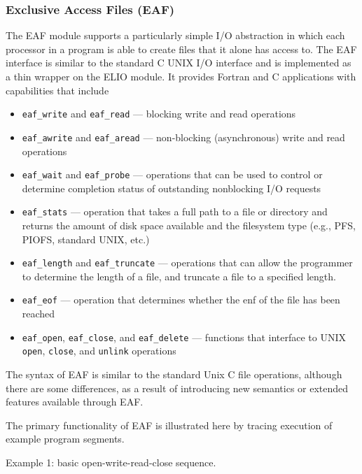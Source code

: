 \subsubsection{Exclusive Access Files (EAF)}

The EAF module supports a particularly simple I/O abstraction in which each processor
in a program is able to create files that it alone has access to.  The EAF interface
is similar to the standard C UNIX I/O interface and is implemented as a thin
wrapper on the ELIO module.  It provides Fortran and C applications with capabilities
that include

\begin{itemize}

\item {\tt eaf\_write} and {\tt eaf\_read} --- blocking write and read operations
\item {\tt eaf\_awrite} and {\tt eaf\_aread} --- non-blocking (asynchronous) 
write and read operations
\item {\tt eaf\_wait} and {\tt eaf\_probe} --- operations that can be used to control
or determine completion status of outstanding nonblocking I/O requests
\item {\tt eaf\_stats} --- operation that takes a full path to a file or directory and
returns the amount of disk space available and the filesystem type (e.g., PFS, PIOFS,
standard UNIX, etc.)
\item {\tt eaf\_length} and {\tt eaf\_truncate} --- operations that can allow the programmer
to determine the length of a file, and truncate a file to a specified length.
\item {\tt eaf\_eof} --- operation that determines whether the enf of the file has been reached
\item {\tt eaf\_open}, {\tt eaf\_close}, and {\tt eaf\_delete} --- functions that interface to
UNIX {\tt open}, {\tt close}, and {\tt unlink} operations
\end{itemize}

The syntax of EAF is similar to the standard Unix C
file operations, although there are some differences, as a result of
introducing new semantics or extended features
available through EAF. 

The primary functionality of EAF is illustrated here by
tracing execution of example program segments. 

Example 1:
basic open-write-read-close sequence. 


